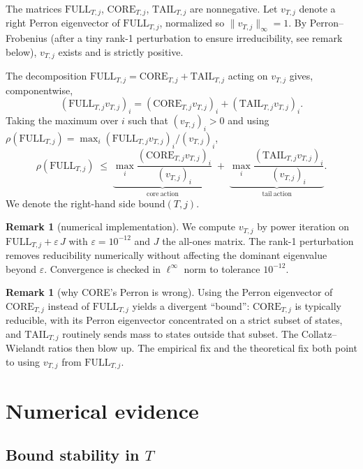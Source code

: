 \documentclass[11pt,a4paper]{article}
\theoremstyle{definition}
\newtheorem{remark}[theorem]{Remark}
\newcommand{\full}{\mathrm{FULL}}
\newcommand{\core}{\mathrm{CORE}}
\newcommand{\tail}{\mathrm{TAIL}}
\newcommand{\spec}{\rho}
\begin{document}
The matrices $\full_{T,j}$, $\core_{T,j}$, $\tail_{T,j}$ are
nonnegative. Let $v_{T,j}$ denote a right Perron eigenvector of
$\full_{T,j}$, normalized so $\|v_{T,j}\|_\infty = 1$. By
Perron--Frobenius (after a tiny rank-1 perturbation to ensure
irreducibility, see remark below), $v_{T,j}$ exists and is strictly
positive.

The decomposition $\full_{T,j} = \core_{T,j} + \tail_{T,j}$ acting
on $v_{T,j}$ gives, componentwise,
\[
(\full_{T,j} v_{T,j})_i
= (\core_{T,j} v_{T,j})_i + (\tail_{T,j} v_{T,j})_i.
\]
Taking the maximum over $i$ such that $(v_{T,j})_i > 0$ and
using $\spec(\full_{T,j}) = \max_i (\full_{T,j} v_{T,j})_i / (v_{T,j})_i$,
\begin{equation}\label{eq:bound}
\boxed{\;
\spec(\full_{T,j})
\;\le\;
\underbrace{\max_i \frac{(\core_{T,j} v_{T,j})_i}{(v_{T,j})_i}}_{\mathrm{core\ action}}
\;+\;
\underbrace{\max_i \frac{(\tail_{T,j} v_{T,j})_i}{(v_{T,j})_i}}_{\mathrm{tail\ action}}.
\;}
\end{equation}
We denote the right-hand side $\mathrm{bound}(T,j)$.

\begin{remark}[numerical implementation]
We compute $v_{T,j}$ by power iteration on
$\full_{T,j} + \varepsilon\, J$ with $\varepsilon = 10^{-12}$ and
$J$ the all-ones matrix. The rank-1 perturbation removes
reducibility numerically without affecting the dominant eigenvalue
beyond $\varepsilon$. Convergence is checked in $\ell^\infty$ norm
to tolerance $10^{-12}$.
\end{remark}

\begin{remark}[why CORE's Perron is wrong]
Using the Perron eigenvector of $\core_{T,j}$ instead of
$\full_{T,j}$ yields a divergent ``bound'': $\core_{T,j}$ is
typically reducible, with its Perron eigenvector concentrated on a
strict subset of states, and $\tail_{T,j}$ routinely sends mass to
states outside that subset. The Collatz--Wielandt ratios then blow
up. The empirical fix and the theoretical fix both point to using
$v_{T,j}$ from $\full_{T,j}$.
\end{remark}

\section{Numerical evidence}
\label{sec:numerics}

\subsection{Bound stability in $T$}
\end{document}
